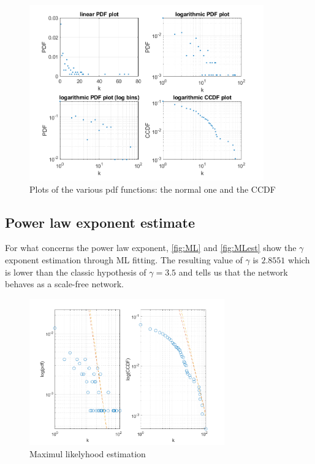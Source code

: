 \documentclass[12pt,a4paper]{article}
\begin{document}
\begin{figure}
\centering
  \includegraphics[width = 0.9\textwidth]{img/pdfPlots}
\caption{Plots of the various pdf functions: the normal one and the CCDF}
\label{fig:pdf}
\end{figure}

\subsection*{Power law exponent estimate}
For what concerns the power law exponent, \autoref{fig:ML} and \autoref{fig:MLest} show the $\gamma$ exponent estimation through ML fitting. The resulting value of $\gamma$ is $2.8551$ which is lower than the classic hypothesis of $\gamma = 3.5$ and tells us that the network behaves as a scale-free network.

\begin{figure}
\centering
  \includegraphics[width = 0.75\textwidth]{img/MLestimate}
\caption{Maximul likelyhood estimation}
\label{fig:MLest}
\end{figure}
\end{document}
